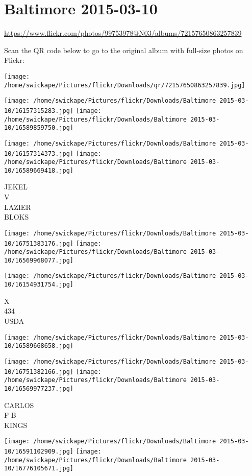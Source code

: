 \documentclass[10pt,letterpaper]{article}
\title{}
\author{}
\date{}
\begin{document}
\section*{Baltimore 2015-03-10}

\url{https://www.flickr.com/photos/99753978@N03/albums/72157650863257839}

Scan the QR code below to go to the original album with full-size photos on Flickr:

\texttt{[image: /home/swickape/Pictures/flickr/Downloads/qr/72157650863257839.jpg]}
\pagebreak

\texttt{[image: /home/swickape/Pictures/flickr/Downloads/Baltimore 2015-03-10/16157315283.jpg]}
\texttt{[image: /home/swickape/Pictures/flickr/Downloads/Baltimore 2015-03-10/16589859750.jpg]}

\texttt{[image: /home/swickape/Pictures/flickr/Downloads/Baltimore 2015-03-10/16157314373.jpg]}
\texttt{[image: /home/swickape/Pictures/flickr/Downloads/Baltimore 2015-03-10/16589669418.jpg]}

JEKEL\\
V\\
LAZIER\\
BLOKS
\pagebreak

\texttt{[image: /home/swickape/Pictures/flickr/Downloads/Baltimore 2015-03-10/16751383176.jpg]}
\texttt{[image: /home/swickape/Pictures/flickr/Downloads/Baltimore 2015-03-10/16569968077.jpg]}

\texttt{[image: /home/swickape/Pictures/flickr/Downloads/Baltimore 2015-03-10/16154931754.jpg]}

X\\
434\\
USDA
\pagebreak

\texttt{[image: /home/swickape/Pictures/flickr/Downloads/Baltimore 2015-03-10/16589668658.jpg]}

\vspace{0.25in}
\texttt{[image: /home/swickape/Pictures/flickr/Downloads/Baltimore 2015-03-10/16751382166.jpg]}
\texttt{[image: /home/swickape/Pictures/flickr/Downloads/Baltimore 2015-03-10/16569977237.jpg]}

CARLOS\\
F B\\
KINGS
\pagebreak

\texttt{[image: /home/swickape/Pictures/flickr/Downloads/Baltimore 2015-03-10/16591102909.jpg]}
\texttt{[image: /home/swickape/Pictures/flickr/Downloads/Baltimore 2015-03-10/16776105671.jpg]}
\end{document}
